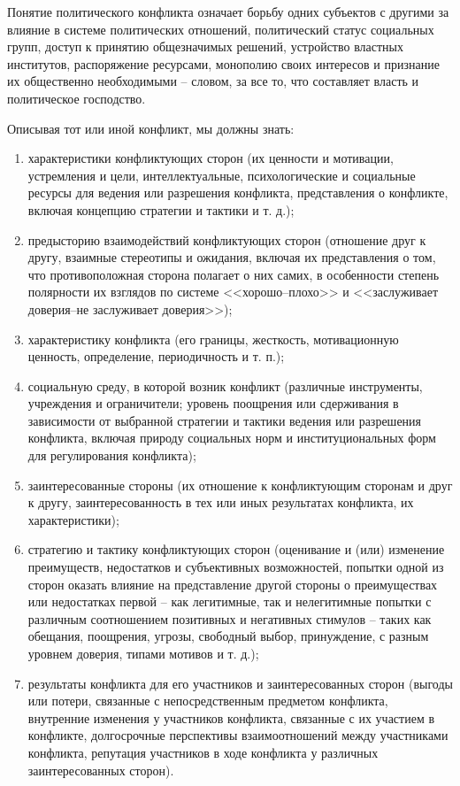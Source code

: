 Понятие политического конфликта означает борьбу одних субъектов с другими за
влияние в системе политических отношений, политический статус социальных групп,
доступ к принятию общезначимых решений, устройство властных институтов,
распоряжение ресурсами, монополию своих интересов и признание их общественно
необходимыми -- словом, за все то, что составляет власть и политическое
господство.

Описывая тот или иной конфликт, мы должны знать:
\begin{enumerate}
    \item характеристики конфликтующих сторон (их ценности и мотивации,
    устремления и цели, интеллектуальные, психологические и социальные ресурсы
    для ведения или разрешения конфликта, представления о конфликте, включая
    концепцию стратегии и тактики и т. д.);
    \item предысторию взаимодействий конфликтующих сторон (отношение друг к
    другу, взаимные стереотипы и ожидания, включая их представления о том, что
    противоположная сторона полагает о них самих, в особенности степень
    полярности их взглядов по системе <<хорошо--плохо>> и
    <<заслуживает доверия--не заслуживает доверия>>);
    \item характеристику конфликта (его границы, жесткость, мотивационную
    ценность, определение, периодичность и т. п.);
    \item социальную среду, в которой возник конфликт (различные инструменты,
    учреждения и ограничители; уровень поощрения или сдерживания в зависимости
    от выбранной стратегии и тактики ведения или разрешения конфликта, включая
    природу социальных норм и институциональных форм для регулирования
    конфликта);
    \item заинтересованные стороны (их отношение к конфликтующим сторонам и
    друг к другу, заинтересованность в тех или иных результатах конфликта, их
    характеристики);
    \item стратегию и тактику конфликтующих сторон (оценивание и (или)
    изменение преимуществ, недостатков и субъективных возможностей, попытки
    одной из сторон оказать влияние на представление другой стороны о
    преимуществах или недостатках первой -- как легитимные, так и нелегитимные
    попытки с различным соотношением позитивных и негативных стимулов -- таких
    как обещания, поощрения, угрозы, свободный выбор, принуждение, с разным
    уровнем доверия, типами мотивов и т. д.);
    \item результаты конфликта для его участников и заинтересованных сторон
    (выгоды или потери, связанные с непосредственным предметом конфликта,
    внутренние изменения у участников конфликта, связанные с их участием в
    конфликте, долгосрочные перспективы взаимоотношений между участниками
    конфликта, репутация участников в ходе конфликта у различных
    заинтересованных сторон).
\end{enumerate}

